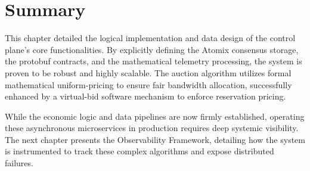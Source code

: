 \section{Summary}

This chapter detailed the logical implementation and data design of the control plane's core functionalities. By explicitly defining the Atomix consensus storage, the protobuf contracts, and the mathematical telemetry processing, the system is proven to be robust and highly scalable. The auction algorithm utilizes formal mathematical uniform-pricing to ensure fair bandwidth allocation, successfully enhanced by a virtual-bid software mechanism to enforce reservation pricing. 

While the economic logic and data pipelines are now firmly established, operating these asynchronous microservices in production requires deep systemic visibility. The next chapter presents the Observability Framework, detailing how the system is instrumented to track these complex algorithms and expose distributed failures.